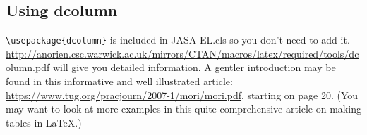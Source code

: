 \documentclass{JASA-EL}
\begin{document}
\subsection{Using dcolumn}
\verb+\usepackage{dcolumn}+ is included in JASA-EL.cls so you
don't need to add it.
\href{http://anorien.csc.warwick.ac.uk/mirrors/CTAN/macros/latex/required/tools\\
/dcolumn.pdf}
{\url{http://anorien.csc.warwick.ac.uk/mirrors/CTAN/macros/latex/required/tools/dcolumn.pdf}}
will give you detailed information.
A gentler introduction may be found in this informative and well
illustrated
article: \href{https://www.tug.org/pracjourn/2007-1/mori/mori.pdf}
{\url{https://www.tug.org/pracjourn/2007-1/mori/mori.pdf}}, starting on page
20. (You may want to look at more examples in this quite comprehensive
article on making tables in \LaTeX.)
\end{document}
